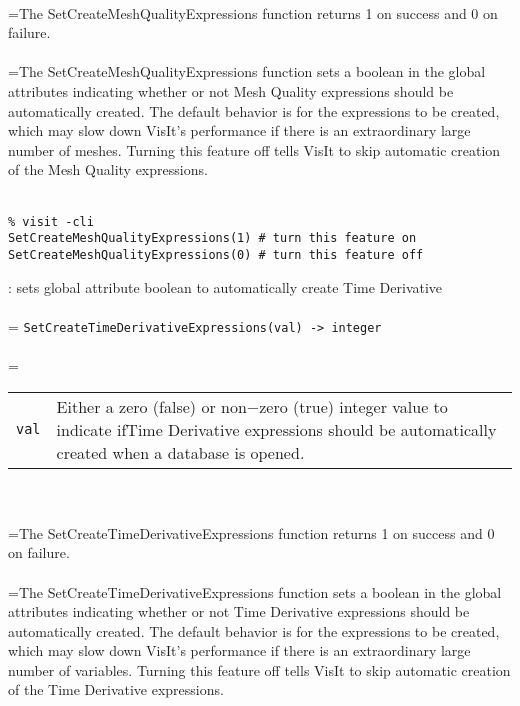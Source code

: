 \documentclass[10pt,a4paper]{report}
\begin{document}
 \\ 
\hangindent=\parindent The SetCreateMeshQualityExpressions function returns 1 on success and 0 on failure. \\[-3mm] 

 \\ 
\hangindent=\parindent The SetCreateMeshQualityExpressions function sets a boolean in the  global attributes indicating whether or not Mesh Quality expressions  should be automatically created. The default behavior is for the  expressions to be created, which may slow down VisIt's performance  if there is an extraordinary large number of meshes.  Turning this  feature off tells VisIt to skip automatic creation of the Mesh Quality  expressions. \\[-3mm] 

\\[-6mm]
\begin{verbatim}% visit -cli
SetCreateMeshQualityExpressions(1) # turn this feature on
SetCreateMeshQualityExpressions(0) # turn this feature off
\end{verbatim}
\newpage


{}
: sets global attribute boolean to automatically create Time Derivative\\[-3mm]

 \\ 
\hangindent=\parindent 
\verb!SetCreateTimeDerivativeExpressions(val) -> integer!\\ [-3mm]

 \\ 
\hangindent=\parindent 
\begin{tabular}{lp{9cm}}
\verb!val! & Either a zero (false) or non$-$zero (true) integer value to indicate ifTime Derivative expressions should be automatically created when a database is opened. \\
\end{tabular} \\[-2mm]


 \\ 
\hangindent=\parindent The SetCreateTimeDerivativeExpressions function returns 1 on success and 0 on failure. \\[-3mm] 

 \\ 
\hangindent=\parindent The SetCreateTimeDerivativeExpressions function sets a boolean in the  global attributes indicating whether or not Time Derivative expressions  should be automatically created. The default behavior is for the  expressions to be created, which may slow down VisIt's performance  if there is an extraordinary large number of variables.  Turning this  feature off tells VisIt to skip automatic creation of the Time Derivative  expressions. \\[-3mm] 
\end{document}

